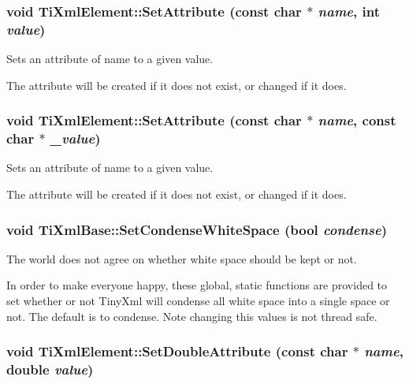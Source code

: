 \subsubsection{\setlength{\rightskip}{0pt plus 5cm}void Ti\-Xml\-Element::Set\-Attribute (const char $\ast$ {\em name}, int {\em value})}\label{classTiXmlElement_TiXmlElementa19}


Sets an attribute of name to a given value. 

The attribute will be created if it does not exist, or changed if it does.
\subsubsection{\setlength{\rightskip}{0pt plus 5cm}void Ti\-Xml\-Element::Set\-Attribute (const char $\ast$ {\em name}, const char $\ast$ {\em \_\-value})}\label{classTiXmlElement_TiXmlElementa11}


Sets an attribute of name to a given value. 

The attribute will be created if it does not exist, or changed if it does.
\subsubsection{\setlength{\rightskip}{0pt plus 5cm}void Ti\-Xml\-Base::Set\-Condense\-White\-Space (bool {\em condense})\hspace{0.3cm}{\tt  [inline, static, inherited]}}\label{classTiXmlBase_TiXmlUnknowne0}


The world does not agree on whether white space should be kept or not. 

In order to make everyone happy, these global, static functions are provided to set whether or not Tiny\-Xml will condense all white space into a single space or not. The default is to condense. Note changing this values is not thread safe.
\subsubsection{\setlength{\rightskip}{0pt plus 5cm}void Ti\-Xml\-Element::Set\-Double\-Attribute (const char $\ast$ {\em name}, double {\em value})}\label{classTiXmlElement_TiXmlElementa20}


